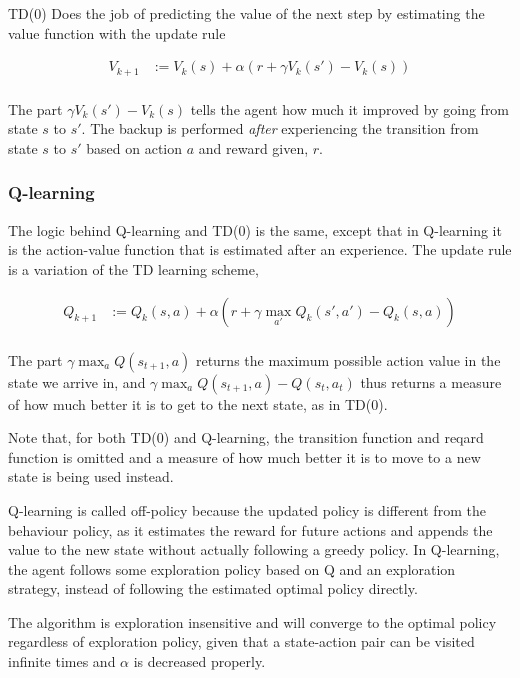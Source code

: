 TD(0) Does the job of predicting the value of the next step by estimating the value function with the update rule

\begin{align}
    V_{k+1} &:= V_k(s) + \alpha(r + \gamma V_k(s') - V_k(s)) \\
    \label{eq:td0}
\end{align}


The part $\gamma V_k(s') - V_k(s)$ tells the agent how much it improved by going from state $s$ to $s'$. The backup is performed \textit{after} experiencing the transition from state $s$ to $s'$ based on action $a$ and reward given, $r$.

\subsubsection{Q-learning}

The logic behind Q-learning and TD(0) is the same, except that in Q-learning it is the action-value function that is estimated after an experience. The update rule is a variation of the TD learning scheme,

\begin{align}
    Q_{k+1} &:= Q_k(s, a) + \alpha(r + \gamma \max_{a'} Q_k(s', a') - Q_k(s, a)) \\
    \label{eq:qlearn}
\end{align}

The part $\gamma \max_a Q(s_{t+1}, a)$ returns the maximum possible action value in the state we arrive in, and 
$\gamma \max_a Q(s_{t+1}, a) - Q(s_{t}, a_t)$ thus returns a measure of how much better it is to get to the next state, as in TD(0).

Note that, for both TD(0) and Q-learning, the transition function and reqard function is omitted and a measure of how much better it is to move to a new state is being used instead.

Q-learning is called off-policy because the updated policy is different from the behaviour policy, as it estimates the reward for future actions and appends the value to the new state without actually following a greedy policy. In Q-learning, the agent follows some exploration policy based on Q and an exploration strategy, instead of following the estimated optimal policy directly.

The algorithm is exploration insensitive and will converge to the optimal policy regardless of exploration policy, given that a state-action pair can be visited infinite times and $\alpha$ is decreased properly.

